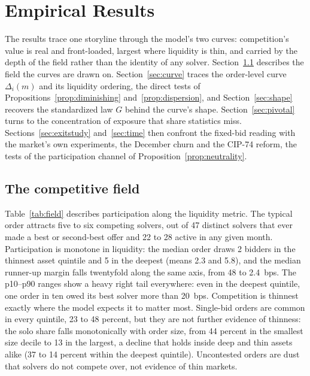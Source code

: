 \documentclass[11pt]{article}
\theoremstyle{plain}
\theoremstyle{definition}
\theoremstyle{remark}
\begin{document}
\section{Empirical Results}\label{sec:results}
The results trace one storyline through the model's two curves: competition's value is real and front-loaded, largest where liquidity is thin, and carried by the depth of the field rather than the identity of any solver. Section~\ref{sec:field} describes the field the curves are drawn on. Section~\ref{sec:curve} traces the order-level curve $\Delta_i(m)$ and its liquidity ordering, the direct tests of Propositions~\ref{prop:diminishing} and~\ref{prop:dispersion}, and Section~\ref{sec:shape} recovers the standardized law $G$ behind the curve's shape. Section~\ref{sec:pivotal} turns to the concentration of exposure that share statistics miss. Sections~\ref{sec:exitstudy} and~\ref{sec:time} then confront the fixed-bid reading with the market's own experiments, the December churn and the CIP-74 reform, the tests of the participation channel of Proposition~\ref{prop:neutrality}.

\subsection{The competitive field}\label{sec:field}
Table~\ref{tab:field} describes participation along the liquidity metric. The typical order attracts five to six competing solvers, out of 47 distinct solvers that ever made a best or second-best offer and 22 to 28 active in any given month. Participation is monotone in liquidity: the median order draws 2 bidders in the thinnest asset quintile and 5 in the deepest (means 2.3 and 5.8), and the median runner-up margin falls twentyfold along the same axis, from 48 to 2.4~bps. The p10--p90 ranges show a heavy right tail everywhere: even in the deepest quintile, one order in ten owed its best solver more than 20~bps. Competition is thinnest exactly where the model expects it to matter most. Single-bid orders are common in every quintile, 23 to 48 percent, but they are not further evidence of thinness: the solo share falls monotonically with order size, from 44 percent in the smallest size decile to 13 in the largest, a decline that holds inside deep and thin assets alike (37 to 14 percent within the deepest quintile). Uncontested orders are dust that solvers do not compete over, not evidence of thin markets.
\end{document}
